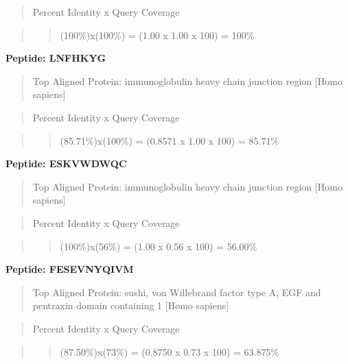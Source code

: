 \documentclass[
  letterpaper,
  DIV=11,
  numbers=noendperiod]{scrartcl}
\begin{document}
\begin{quote}
Percent Identity x Query Coverage
\end{quote}

\begin{quote}
\begin{quote}
(100\%)x(100\%) = (1.00 x 1.00 x 100) = 100\%
\end{quote}
\end{quote}

\textbf{Peptide: LNFHKYG}

\begin{quote}
Top Aligned Protein: immunoglobulin heavy chain junction region {[}Homo
sapiens{]}
\end{quote}

\begin{quote}
Percent Identity x Query Coverage
\end{quote}

\begin{quote}
\begin{quote}
(85.71\%)x(100\%) = (0.8571 x 1.00 x 100) = 85.71\%
\end{quote}
\end{quote}

\textbf{Peptide: ESKVWDWQC}

\begin{quote}
Top Aligned Protein: immunoglobulin heavy chain junction region {[}Homo
sapiens{]}
\end{quote}

\begin{quote}
Percent Identity x Query Coverage
\end{quote}

\begin{quote}
\begin{quote}
(100\%)x(56\%) = (1.00 x 0.56 x 100) = 56.00\%
\end{quote}
\end{quote}

\textbf{Peptide: FESEVNYQIVM}

\begin{quote}
Top Aligned Protein: sushi, von Willebrand factor type A, EGF and
pentraxin domain containing 1 {[}Homo sapiens{]}
\end{quote}

\begin{quote}
Percent Identity x Query Coverage
\end{quote}

\begin{quote}
\begin{quote}
(87.50\%)x(73\%) = (0.8750 x 0.73 x 100) = 63.875\%
\end{quote}
\end{quote}
\end{document}
